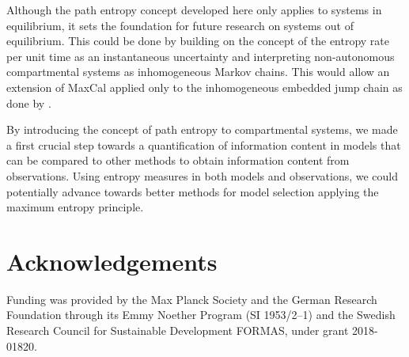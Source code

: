 \documentclass[smallextended]{svjour3}
\begin{document}
Although the path entropy concept developed here only applies to systems in equilibrium, it sets the foundation for future research on systems out of equilibrium. 
This could be done by building on the concept of the entropy rate per unit time as an instantaneous uncertainty and interpreting non-autonomous compartmental systems as inhomogeneous Markov chains.
This would allow an extension of MaxCal applied only to the inhomogeneous embedded jump chain as done by \citet{Ge2012JCP}.


By introducing the concept of path entropy to compartmental systems, we made a first crucial step towards a quantification of information content in models that can be compared to other methods to obtain information content from observations. Using entropy measures in both models and observations, we could potentially advance towards better methods for model selection applying the maximum entropy principle. 




\section{Acknowledgements}
Funding was provided by the Max Planck Society and the German Research Foundation through its Emmy Noether Program (SI 1953/2--1) and the Swedish Research Council for Sustainable Development FORMAS, under grant 2018-01820.
\end{document}
